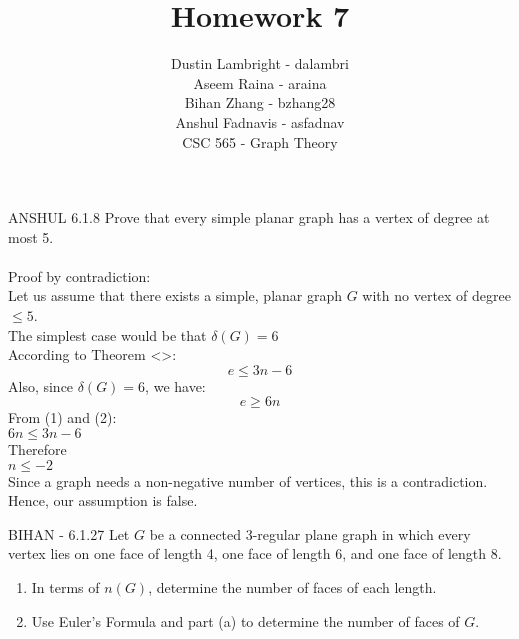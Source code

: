 \documentclass[12pt]{article}
\newenvironment{question}[2][Question]{\begin{trivlist}
\item[\hskip \labelsep {\bfseries #1}\hskip \labelsep {\bfseries #2.}]}{\end{trivlist}}
\begin{document}


\title{Homework 7}%
\author{Dustin Lambright - dalambri \\ Aseem Raina - araina \\ Bihan Zhang - bzhang28 \\ Anshul Fadnavis - asfadnav\\
CSC 565 - Graph Theory} %

\maketitle


\begin{question}{1} - \color{blue} ANSHUL \color{black}
6.1.8  Prove that every simple planar graph has a vertex of degree at most 5.\\
\\
Proof by contradiction:\\
Let us assume that there exists a simple, planar graph $G$ with no vertex of degree $\leq 5$.\\
The simplest case would be that $\delta(G) = 6$\\
According to Theorem <>:\\
\begin{equation}
e \leq 3n - 6
\end{equation}
Also, since $\delta(G) = 6$, we have:\\
\begin{equation}
e \geq 6n
\end{equation}
From (1) and (2):\\\indent$6n \leq 3n - 6$\\
Therefore\\\indent$n \leq -2$\\
Since a graph needs a non-negative number of vertices, this is a contradiction.\\
Hence, our assumption is false.
\end{question}

\begin{question}{2} - \color{blue}BIHAN\color{black} - 
6.1.27  Let $G$ be a connected 3-regular plane graph in which every vertex lies on one face of length 4, one face of length 6, and one face of length 8.
\begin{enumerate}[label=\alph*)]
  \item In terms of $n(G)$, determine the number of faces of each length.
  \item Use Euler's Formula and part (a) to determine the number of faces of $G$.
\end{enumerate}
\end{question}
\end{document}
